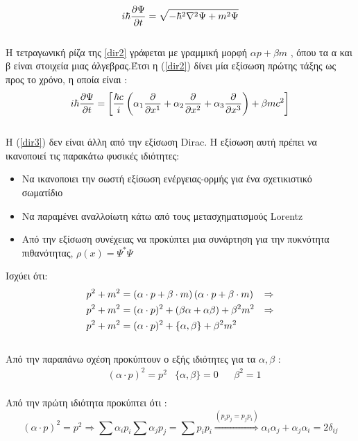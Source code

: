 \begin{equation}
   i\hbar \frac{\partial \Psi}{\partial t}=\sqrt{-\hbar^2 \nabla^2\Psi+m^2\Psi}
   \label{dir2} 
\end{equation}
\\Η τετραγωνική ρίζα της \ref{dir2} γράφεται με γραμμική μορφή $ \alpha p + \beta m  $ , όπου τα α και β είναι στοιχεία μιας άλγεβρας.Έτσι η  (\ref{dir2}) δίνει μία εξίσωση πρώτης τάξης ως προς το χρόνο, η οποία είναι : 
\begin{equation}
   i\hbar \frac{\partial \Psi}{\partial t}=\left[  \frac{\hbar c}{i} \left(  \alpha_1 \frac{\partial }{\partial x^1}+\alpha_2 \frac{\partial }{\partial x^2}+ \alpha_3 \frac{\partial }{\partial x^3} \right)  + \beta m c^2 \right] 
   \label{dir3} 
\end{equation}
\\Η (\ref{dir3}) δεν είναι άλλη από την εξίσωση \textlatin{Dirac}. Η εξίσωση αυτή πρέπει να ικανοποιεί τις παρακάτω φυσικές ιδιότητες:
\begin{itemize}
  \item Να ικανοποιει την σωστή εξίσωση ενέργειας-ορμής για ένα σχετικιστικό σωματίδιο 
  \item Να παραμένει αναλλοίωτη κάτω από τους μετασχηματισμούς \textlatin{Lorentz}
  \item Από την εξίσωση συνέχειας να προκύπτει μια συνάρτηση για την πυκνότητα πιθανότητας, $\rho(x)= \Psi^* \Psi $
\end{itemize}
Ισχύει ότι: 
\begin{align*}
  &p^2 + m^2 = \left(  \alpha \cdot p+ \beta \cdot m \right)  \left(  \alpha \cdot p+ \beta \cdot m \right)  &\Rightarrow 
  \\&p^2 + m^2 =(\alpha \cdot p)^2 + (\beta \alpha + \alpha \beta) +\beta^2 m^2  &\Rightarrow 
  \\&p^2 + m^2 =(\alpha \cdot p)^2 + \{ \alpha,\beta\} +\beta^2 m^2 
\end{align*}
\\Από την παραπάνω σχέση προκύπτουν ο εξής ιδιότητες για τα $\alpha, \beta$ : 
\begin{align*}
  &(\alpha \cdot p)^2=p^2  &\{ \alpha,\beta\}=0  &  &\beta^2=1
\end{align*}
\\Από την πρώτη ιδιότητα προκύπτει ότι :\\ 
\begin{equation*}
  (\alpha \cdot p)^2=p^2 \Rightarrow  \sum \alpha _i p_i  \sum \alpha _j p_j =  \sum p_i  p_i \stackrel{(p_i p_j = p_j p_i)}{\Rightarrow}
    \alpha _i \alpha _j + \alpha _j \alpha _i = 2 \delta _{ij}
\end{equation*}\\

